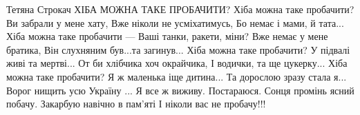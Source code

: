  
 
 
 
 

Тетяна Строкач
ХІБА МОЖНА ТАКЕ ПРОБАЧИТИ?
Хіба можна таке пробачити?
Ви забрали у мене хату,
Вже ніколи не усміхатимусь,
Бо немає і мами, й тата...
Хіба можна таке пробачити —
Ваші танки, ракети, міни?
Вже немає у мене братика,
Він слухняним був...та загинув...
Хіба можна таке пробачити?
У підвалі живі та мертві...
От би хлібчика хоч окрайчика,
І водички, та ще цукерку...
Хіба можна таке пробачити?
Я ж маленька іще дитина...
Та дорослою зразу стала я...
Ворог нищить усю Україну ...
Я все ж виживу. Постараюся.
Сонця промінь ясний побачу.
Закарбую навічно в пам'яті
І ніколи вас не пробачу!!!

